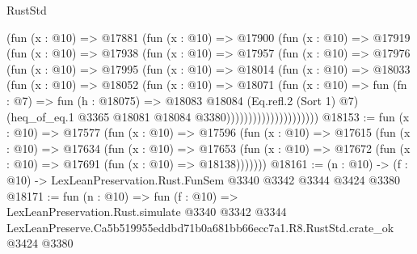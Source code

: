\begin{lexlean}{RustStd}
\begin{coremodule}
                    (fun (x : @10) =>
                    @17881
                      (fun (x : @10) =>
                      @17900
                        (fun (x : @10) =>
                        @17919
                          (fun (x : @10) =>
                          @17938
                            (fun (x : @10) =>
                            @17957
                              (fun (x : @10) =>
                              @17976
                                (fun (x : @10) =>
                                @17995
                                  (fun (x : @10) =>
                                  @18014
                                    (fun (x : @10) =>
                                    @18033
                                      (fun (x : @10) =>
                                      @18052
                                        (fun (x : @10) =>
                                        @18071
                                          (fun (x : @10) =>
                                          fun (fn : @7) =>
                                          fun (h : @18075) =>
                                          @18083
                                            @18084
                                            (Eq.refl.{2} (Sort 1) @7)
                                            (heq_of_eq.{1}
                                              @3365
                                              @18081
                                              @18084
                                              @3380)))))))))))))))))))))
@18153 := fun (x : @10) =>
  @17577
    (fun (x : @10) =>
    @17596
      (fun (x : @10) =>
      @17615
        (fun (x : @10) =>
        @17634
          (fun (x : @10) =>
          @17653 (fun (x : @10) => @17672 (fun (x : @10) => @17691 (fun (x : @10) => @18138)))))))
@18161 := (n : @10) -> (f : @10) -> LexLeanPreservation.Rust.FunSem @3340 @3342 @3344 @3424 @3380
@18171 := fun (n : @10) =>
  fun (f : @10) =>
  LexLeanPreservation.Rust.simulate
    @3340
    @3342
    @3344
    LexLeanPreserve.Ca5b519955eddbd71b0a681bb66ecc7a1.R8.RustStd.crate_ok
    @3424
    @3380
\end{coremodule}
\end{lexlean}
